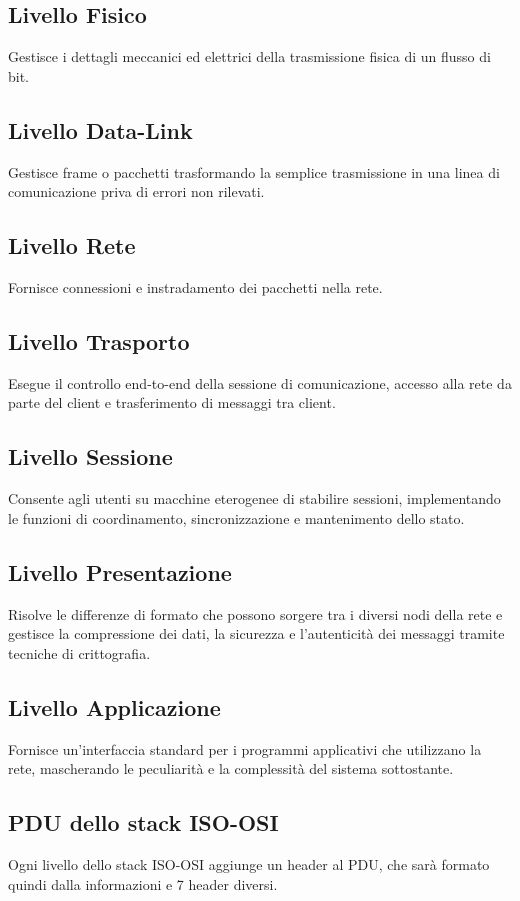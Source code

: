 \subsection{Livello Fisico}
Gestisce i dettagli meccanici ed elettrici della trasmissione fisica di un flusso di bit.

\subsection{Livello Data-Link}
Gestisce frame o pacchetti trasformando la semplice trasmissione in una linea di comunicazione priva di errori non rilevati.

\subsection{Livello Rete}
Fornisce connessioni e instradamento dei pacchetti nella rete.

\subsection{Livello Trasporto}
Esegue il controllo end-to-end della sessione di comunicazione, accesso alla rete da parte del client e trasferimento di messaggi tra client.

\subsection{Livello Sessione}
Consente agli utenti su macchine eterogenee di stabilire sessioni, implementando le funzioni di coordinamento, sincronizzazione e mantenimento dello stato.

\subsection{Livello Presentazione}
Risolve le differenze di formato che possono sorgere tra i diversi nodi della rete e gestisce la compressione dei dati, la sicurezza e l'autenticità dei messaggi tramite tecniche di crittografia.

\subsection{Livello Applicazione}
Fornisce un'interfaccia standard per i programmi applicativi che utilizzano la rete, mascherando le peculiarità e la complessità del sistema sottostante.

\subsection{PDU dello stack ISO-OSI}
Ogni livello dello stack ISO-OSI aggiunge un header al PDU, che sarà formato quindi dalla informazioni e 7 header diversi.


